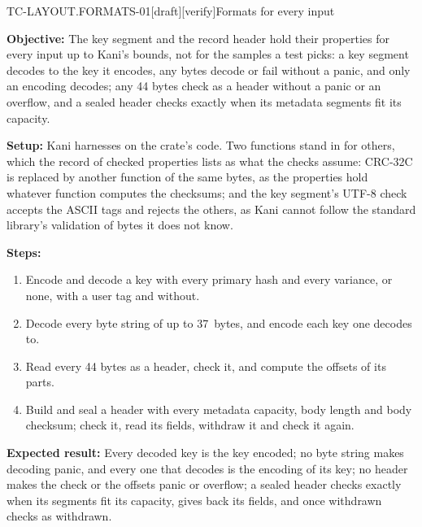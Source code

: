 \begin{requirement}{TC-LAYOUT.FORMATS-01}[draft][verify]{Formats for every input}


  \textbf{Objective:} The key segment and the record header hold their
  properties for every input up to Kani's bounds, not for the samples a test
  picks: a key segment decodes to the key it encodes, any bytes decode or
  fail without a panic, and only an encoding decodes; any 44 bytes check as
  a header without a panic or an overflow, and a sealed header checks
  exactly when its metadata segments fit its capacity.

  \textbf{Setup:} Kani harnesses on the crate's code. Two functions stand in
  for others, which the record of checked properties lists as what the
  checks assume: CRC-32C is replaced by another function of the same bytes,
  as the properties hold whatever function computes the checksums; and the
  key segment's UTF-8 check accepts the ASCII tags and rejects the others,
  as Kani cannot follow the standard library's validation of bytes it does
  not know.

  \textbf{Steps:}
  \begin{enumerate}
    \item Encode and decode a key with every primary hash and every variance,
      or none, with a user tag and without.
    \item Decode every byte string of up to 37~bytes, and encode each key
      one decodes to.
    \item Read every 44 bytes as a header, check it, and compute the offsets
      of its parts.
    \item Build and seal a header with every metadata capacity, body length
      and body checksum; check it, read its fields, withdraw it and check it
      again.
  \end{enumerate}

  \textbf{Expected result:} Every decoded key is the key encoded; no byte
  string makes decoding panic, and every one that decodes is the encoding of
  its key; no header makes the check or the offsets panic or overflow; a
  sealed header checks exactly when its segments fit its capacity, gives
  back its fields, and once withdrawn checks as withdrawn.



\end{requirement}

